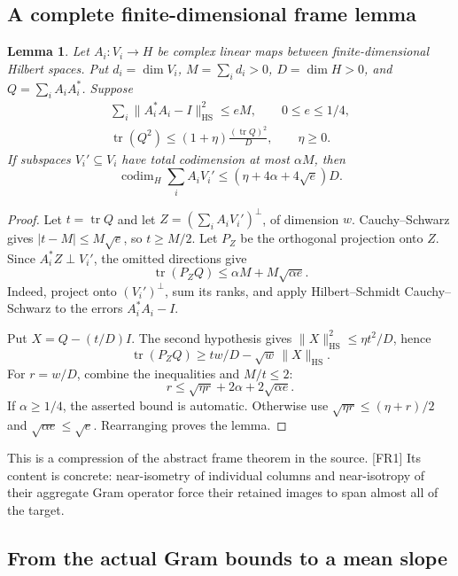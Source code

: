 \documentclass[11pt,a4paper]{article}
\numberwithin{equation}{section}
\newtheorem{lemma}[theorem]{Lemma}
\theoremstyle{remark}\newtheorem{remark}[theorem]{Remark}
\newcommand{\HS}{\mathrm{HS}}
\newcommand{\tr}{\operatorname{tr}}
\newcommand{\codim}{\operatorname{codim}}
\begin{document}
\subsection{A complete finite-dimensional frame lemma}

\begin{lemma}\label{lem:frame}
Let $A_i:V_i\to H$ be complex linear maps between finite-dimensional Hilbert spaces. Put $d_i=\dim V_i$, $M=\sum_i d_i>0$, $D=\dim H>0$, and $Q=\sum_iA_iA_i^*$. Suppose
\begin{gather*}
\sum_i\|A_i^*A_i-I\|_\HS^2\le eM,\qquad 0\le e\le1/4,\\
\tr(Q^2)\le(1+\eta)\frac{(\tr Q)^2}{D},\qquad\eta\ge0.
\end{gather*}
If subspaces $V_i'\subseteq V_i$ have total codimension at most $\alpha M$, then
\[
\codim_H\sum_i A_iV_i'\le(\eta+4\alpha+4\sqrt e)D.
\]
\end{lemma}

\begin{proof}
Let $t=\tr Q$ and let $Z=(\sum_iA_iV_i')^\perp$, of dimension $w$. Cauchy--Schwarz gives $|t-M|\le M\sqrt e$, so $t\ge M/2$. Let $P_Z$ be the orthogonal projection onto $Z$. Since $A_i^*Z\perp V_i'$, the omitted directions give
\[
\tr(P_ZQ)\le\alpha M+M\sqrt{\alpha e}.
\]
Indeed, project onto $(V_i')^\perp$, sum its ranks, and apply Hilbert--Schmidt Cauchy--Schwarz to the errors $A_i^*A_i-I$.

Put $X=Q-(t/D)I$. The second hypothesis gives $\|X\|_\HS^2\le\eta t^2/D$, hence
\[
\tr(P_ZQ)\ge tw/D-\sqrt w\,\|X\|_\HS.
\]
For $r=w/D$, combine the inequalities and $M/t\le2$:
\[
r\le\sqrt{\eta r}+2\alpha+2\sqrt{\alpha e}.
\]
If $\alpha\ge1/4$, the asserted bound is automatic. Otherwise use $\sqrt{\eta r}\le(\eta+r)/2$ and $\sqrt{\alpha e}\le\sqrt e$. Rearranging proves the lemma.
\end{proof}

This is a compression of the abstract frame theorem in the source. \textsf{[FR1]}\cite{frame} Its content is concrete: near-isometry of individual columns and near-isotropy of their aggregate Gram operator force their retained images to span almost all of the target.

\subsection{From the actual Gram bounds to a mean slope}\label{sec:gram-to-slope}
\end{document}
